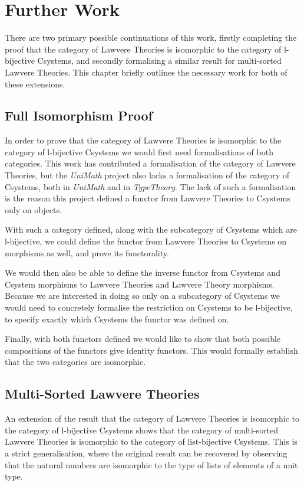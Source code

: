 \chapter{Further Work}
There are two primary possible continuations of this work, firstly completing
the proof that the category of Lawvere Theories is isomorphic to the category of
l-bijective Csystems, and secondly formalising a similar result for multi-sorted
Lawvere Theories. This chapter briefly outlines the necessary work for both of
these extensions.

\section{Full Isomorphism Proof}
In order to prove that the category of Lawvere Theories is isomorphic to the
category of l-bijective Csystems we would first need formalisations of both
categories. This work has contributed a formalisation of the category of Lawvere
Theories, but the \textit{UniMath} project also lacks a formalisation of the
category of Csystems, both in \textit{UniMath} and in \textit{TypeTheory}. The
lack of such a formalisation is the reason this project defined a functor from
Lawvere Theories to Csystems only on objects.

With such a category defined, along with the subcategory of Csystems which are
l-bijective, we could define the functor from Lawvere Theories to Csystems on
morphisms as well, and prove its functorality.

We would then also be able to define the inverse functor from Csystems and
Csystem morphisms to Lawvere Theories and Lawvere Theory morphisms. Because we
are interested in doing so only on a subcategory of Csystems we would need to
concretely formalise the restriction on Csystems to be l-bijective, to specify
exactly which Csystems the functor was defined on.

Finally, with both functors defined we would like to show that both possible
compositions of the functors give identity functors. This would formally
establish that the two categories are isomorphic.

\section{Multi-Sorted Lawvere Theories}
An extension of the result that the category of Lawvere Theories is isomorphic
to the category of l-bijective Csystems shows that the category of multi-sorted
Lawvere Theories is isomorphic to the category of list-bijective Csystems. This
is a strict generalisation, where the original result can be recovered by
observing that the natural numbers are isomorphic to the type of lists of
elements of a unit type.
